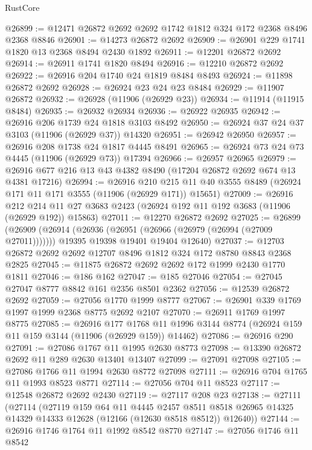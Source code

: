 \begin{lexlean}{RustCore}
\begin{coremodule}
@26899 := @12471 @26872 @2692 @2692 @1742 @1812 @324 @172 @2368 @8496 @2368 @8846
@26901 := @14273 @26872 @2692
@26909 := @26901 @229 @1741 @1820 @13 @2368 @8494 @2430 @1892
@26911 := @12201 @26872 @2692
@26914 := @26911 @1741 @1820 @8494
@26916 := @12210 @26872 @2692
@26922 := @26916 @204 @1740 @24 @1819 @8484 @8493
@26924 := @11898 @26872 @2692
@26928 := @26924 @23 @24 @23 @8484
@26929 := @11907 @26872
@26932 := @26928 (@11906 (@26929 @23))
@26934 := @11914 (@11915 @8484)
@26935 := @26932 @26934
@26936 := @26922 @26935
@26942 := @26916 @206 @1739 @24 @1818 @3103 @8492
@26950 := @26924 @37 @24 @37 @3103 (@11906 (@26929 @37)) @14320
@26951 := @26942 @26950
@26957 := @26916 @208 @1738 @24 @1817 @4445 @8491
@26965 := @26924 @73 @24 @73 @4445 (@11906 (@26929 @73)) @17394
@26966 := @26957 @26965
@26979 := @26916 @677 @216 @13 @43 @4382 @8490 (@17204 @26872 @2692 @674 @13 @4381 @17216)
@26994 := @26916
    @210
    @215
    @11
    @40
    @3555
    @8489
    (@26924 @171 @11 @171 @3555 (@11906 (@26929 @171)) @15651)
@27009 := @26916
    @212
    @214
    @11
    @27
    @3683
    @2423
    (@26924 @192 @11 @192 @3683 (@11906 (@26929 @192)) @15863)
@27011 := @12270 @26872 @2692
@27025 := @26899
    (@26909
      (@26914 (@26936 (@26951 (@26966 (@26979 (@26994 (@27009 @27011)))))))
      @19395
      @19398
      @19401
      @19404
      @12640)
@27037 := @12703 @26872 @2692 @2692 @12707 @8496 @1812 @324 @172 @8780 @8843 @2368 @2825
@27045 := @11875 @26872 @2692 @2692 @172 @1999 @2430 @1770 @1811
@27046 := @186 @162
@27047 := @185 @27046
@27054 := @27045 @27047 @8777 @8842 @161 @2356 @8501 @2362
@27056 := @12539 @26872 @2692
@27059 := @27056 @1770 @1999 @8777
@27067 := @26901 @339 @1769 @1997 @1999 @2368 @8775 @2692 @2107
@27070 := @26911 @1769 @1997 @8775
@27085 := @26916
    @177
    @1768
    @11
    @1996
    @3144
    @8774
    (@26924 @159 @11 @159 @3144 (@11906 (@26929 @159)) @14462)
@27086 := @26916 @290
@27091 := @27086 @1767 @11 @1995 @2630 @8773
@27098 := @13390 @26872 @2692 @11 @289 @2630 @13401 @13407
@27099 := @27091 @27098
@27105 := @27086 @1766 @11 @1994 @2630 @8772 @27098
@27111 := @26916 @704 @1765 @11 @1993 @8523 @8771
@27114 := @27056 @704 @11 @8523
@27117 := @12548 @26872 @2692 @2430
@27119 := @27117 @208 @23
@27138 := @27111
    (@27114
      (@27119
        @159
        @64
        @11
        @4445
        @2457
        @8511
        @8518
        @26965
        @14325
        @14329
        @14333
        @12628
        (@12166 (@12630 @8518 @8512))
        @12640))
@27144 := @26916 @1746 @1764 @11 @1992 @8542 @8770
@27147 := @27056 @1746 @11 @8542

\end{coremodule}
\end{lexlean}
